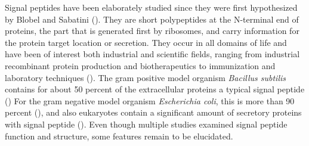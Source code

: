 Signal peptides have been elaborately studied since they were first hypothesized by Blobel and Sabatini (\cite{blobel1971}).
They are short polypeptides at the N-terminal end of proteins, the part that is generated first by ribosomes,
and carry information for the protein target location or secretion.
They occur in all domains of life and have been of interest both industrial and scientific fields,
ranging from industrial recombinant protein production and biotherapeutics to immunization and laboratory techniques (\cite{owji2018}).
The gram positive model organism \textit{Bacillus subtilis} contains for about 50 percent of the extracellular proteins a typical signal peptide (\cite{humphery2006})
For the gram negative model organism \textit{Escherichia coli}, this is more than 90 percent (\cite{rusch2007}),
and also eukaryotes contain a significant amount of secretory proteins with signal peptide (\cite{kanapin2003}).
Even though multiple studies examined signal peptide function and structure,
some features remain to be elucidated.

